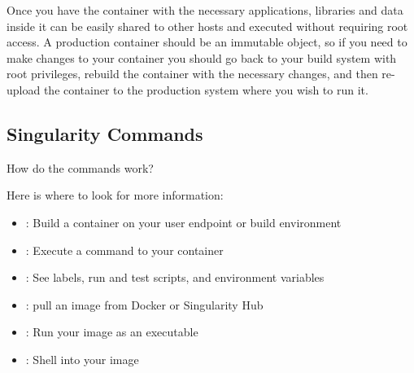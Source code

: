 \documentclass[letterpaper,10pt,english]{sphinxmanual}
\begin{document}
Once you have the container with the necessary applications, libraries
and data inside it can be easily shared to other hosts and executed
without requiring root access. A production container should be an
immutable object, so if you need to make changes to your container you
should go back to your build system with root privileges, rebuild the
container with the necessary changes, and then re-upload the container
to the production system where you wish to run it.


\subsection{Singularity Commands}
\label{\detokenize{introduction:singularity-commands}}
How do the commands work?

Here is where to look for more information:
\begin{itemize}
\item {} 
 : Build a container on your user endpoint or build environment

\item {} 
 : Execute a command to your container

\item {} 
 : See labels, run and test scripts, and environment variables

\item {} 
 : pull an image from Docker or Singularity Hub

\item {} 
 : Run your image as an executable

\item {} 
 : Shell into your image

\end{itemize}
\end{document}
